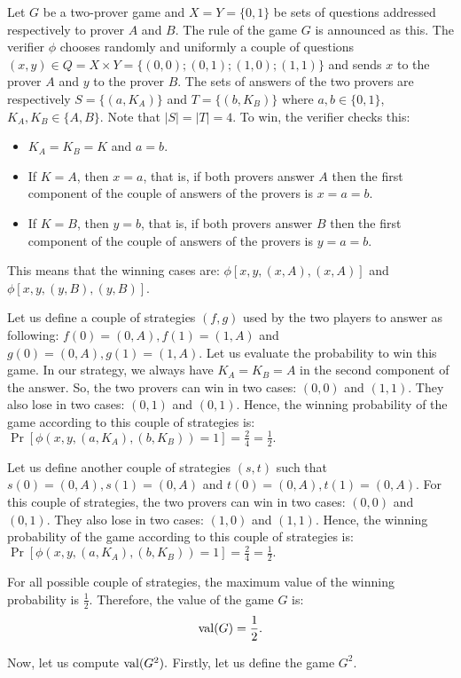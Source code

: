 Let $G$ be a two-prover game and  $X=Y=\{0,1\}$ be sets of questions addressed respectively to prover $A$ and $B$. The rule of the game $G$ is announced as this. The verifier $\phi$ chooses randomly and uniformly a couple of questions $(x,y) \in Q=X \times Y=\{(0,0);(0,1);(1,0);(1,1)\}$ and sends $x$ to the prover $A$ and $y$ to the prover $B$. The sets of answers of the  two provers are  respectively  $S=\{(a,K_A)\}$ and $T=\{(b,K_B)\}$ where $a,b \in \{0,1\}$,  $K_A,K_B \in \{A,B\}$. Note that $|S|=|T|=4.$ To win, the verifier checks this: \begin{itemize}
\item $K_A=K_B=K$ and $a=b$.
\item  If $K=A$, then $x=a$, that is,  if both provers answer $A$ then the  first component of the couple of  answers of the provers is $x=a=b$.
\item If $K=B$, then $y=b$, that is,  if both provers answer $B$ then the  first component of the couple of  answers of the provers is $y=a=b$.
\end{itemize}
This means that the winning cases are: $\phi[x,y, (x,A), (x,A)]$ and $\phi[x,y, (y,B), (y,B)]$.

Let us define a couple of strategies $(f,g)$ used by the two players to answer as following:  $f(0)=(0,A), f(1)=(1,A)$ and  $g(0)=(0,A), g(1)=(1,A)$.
 Let us evaluate the probability to win this game. In our strategy, we always have $K_A=K_B=A$ in the second component of the answer. So, the two provers can win in two cases: $(0,0)$ and $(1,1)$. They also lose  in two cases: $(0,1)$ and $(0,1)$. Hence, the winning probability of the game according to this couple of strategies is: $\Pr [\phi(x,y, (a,K_A), (b,K_B))=1]=\frac{2}{4}=\frac{1}{2}.$
 
 Let us define another couple of strategies $(s,t)$ such that $s(0)=(0,A), s(1)=(0,A)$ and  $t(0)=(0,A), t(1)=(0,A)$. For this couple of strategies, the two provers can win in two cases: $(0,0)$ and $(0,1)$. They also lose  in two cases: $(1,0)$ and $(1,1)$. Hence, the winning probability of the game according to this couple of strategies is: $\Pr [\phi(x,y, (a,K_A), (b,K_B))=1]=\frac{2}{4}=\frac{1}{2}.$

For all possible couple of strategies, the maximum value of the winning probability is $\frac{1}{2}$. Therefore, the value of the game $G$  is: $$\mathrm{val} (G)= \frac{1}{2}.$$
 
Now, let us compute $\mathrm{val} (G^2).$ Firstly, let us define the game $G^2.$

